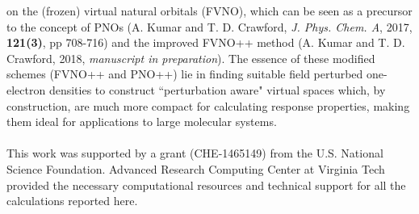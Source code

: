 \documentclass[12pt]{report}
\begin{document}
on the (frozen) virtual natural orbitals (FVNO), which can be seen as a precursor to the concept 
of PNOs (A. Kumar and T. D. Crawford, {\em J. Phys. Chem. A}, 2017, {\bf 121(3)}, pp 708-716) and 
the improved FVNO++ method (A. Kumar and T. D. Crawford, 2018, {\em manuscript in 
preparation}). The essence of these modified schemes (FVNO++ and PNO++) lie in finding suitable 
field perturbed one-electron densities to construct ``perturbation aware" virtual spaces which,
by construction, are much more compact for calculating response properties, making them ideal
for applications to large molecular systems. \\\\
\vfill
This work was supported by a grant (CHE-1465149) from
the U.S. National Science Foundation. Advanced Research Computing 
Center at Virginia Tech provided the necessary computational resources and technical 
support for all the calculations reported here.

\pagebreak


\tableofcontents
\pagebreak

\listoffigures
\pagebreak

\listoftables
\pagebreak

\pagestyle{myheadings}

\def\ket#1{| #1 \rangle}
\def\bra#1{\langle #1 |}
\def\bm#1{\mbox{\boldmath $#1$}}
\def\degrees{deg dm$^{-1}$ (g/mL)$^{-1}$}
\def\optrot{$[\alpha]$}
\def\crt#1{a_{#1}^{\dagger}}
\def\ann#1{a_{#1}^{\ }}
\def\cgs{($10^{-40}$ cgs)}
\end{document}
